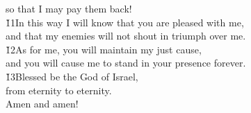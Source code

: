 \begin{poetry}
\poemll    so that I may pay them back! \\
\poeml \v{11}In this way I will know that you are pleased with me, \\
\poemll    and that my enemies will not shout in triumph over me. \\
\poeml \v{12}As for me, you will maintain my just cause, \\
\poemll    and you will cause me to stand in your presence forever. \\
\poeml \v{13}Blessed be the  God of Israel, \\
\poemll    from eternity to eternity. \\
\poemlll       Amen and amen!
\end{poetry}

